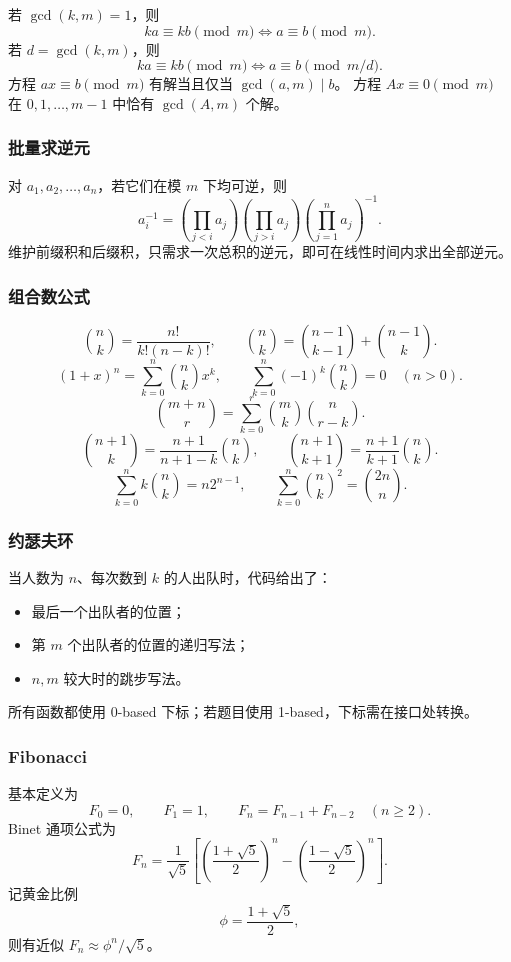 若 $\gcd(k,m)=1$，则
\[
  ka\equiv kb\pmod m
  \iff a\equiv b\pmod m.
\]
若 $d=\gcd(k,m)$，则
\[
  ka\equiv kb\pmod m
  \iff a\equiv b\pmod{m/d}.
\]
方程 $ax\equiv b\pmod m$ 有解当且仅当 $\gcd(a,m)\mid b$。
方程 $Ax\equiv0\pmod m$ 在 $0,1,\ldots,m-1$ 中恰有 $\gcd(A,m)$ 个解。

\subsubsection{批量求逆元}

对 $a_1,a_2,\ldots,a_n$，若它们在模 $m$ 下均可逆，则
\[
  a_i^{-1}
  =\left(\prod_{j<i}a_j\right)
   \left(\prod_{j>i}a_j\right)
   \left(\prod_{j=1}^{n}a_j\right)^{-1}.
\]
维护前缀积和后缀积，只需求一次总积的逆元，即可在线性时间内求出全部逆元。

\subsubsection{组合数公式}

\[
  \binom nk=\frac{n!}{k!(n-k)!},
  \qquad
  \binom nk=\binom{n-1}{k-1}+\binom{n-1}{k}.
\]
\[
  (1+x)^n=\sum_{k=0}^{n}\binom nkx^k,
  \qquad
  \sum_{k=0}^{n}(-1)^k\binom nk=0\quad(n>0).
\]
\[
  \binom{m+n}{r}
  =\sum_{k=0}^{r}\binom mk\binom n{r-k}.
\]
\[
  \binom{n+1}{k}
  =\frac{n+1}{n+1-k}\binom nk,
  \qquad
  \binom{n+1}{k+1}
  =\frac{n+1}{k+1}\binom nk.
\]
\[
  \sum_{k=0}^{n}k\binom nk=n2^{n-1},
  \qquad
  \sum_{k=0}^{n}\binom nk^2=\binom{2n}{n}.
\]

\subsubsection{约瑟夫环}

当人数为 $n$、每次数到 $k$ 的人出队时，代码给出了：
\begin{itemize}
  \item 最后一个出队者的位置；
  \item 第 $m$ 个出队者的位置的递归写法；
  \item $n,m$ 较大时的跳步写法。
\end{itemize}
所有函数都使用 0-based 下标；若题目使用 1-based，下标需在接口处转换。

\subsubsection{Fibonacci}

基本定义为
\[
  F_0=0,
  \qquad F_1=1,
  \qquad F_n=F_{n-1}+F_{n-2}\quad(n\ge2).
\]
Binet 通项公式为
\[
  F_n=\frac1{\sqrt5}\left[
    \left(\frac{1+\sqrt5}{2}\right)^n
    -\left(\frac{1-\sqrt5}{2}\right)^n
  \right].
\]
记黄金比例
\[
  \phi=\frac{1+\sqrt5}{2},
\]
则有近似 $F_n\approx\phi^n/\sqrt5$。

